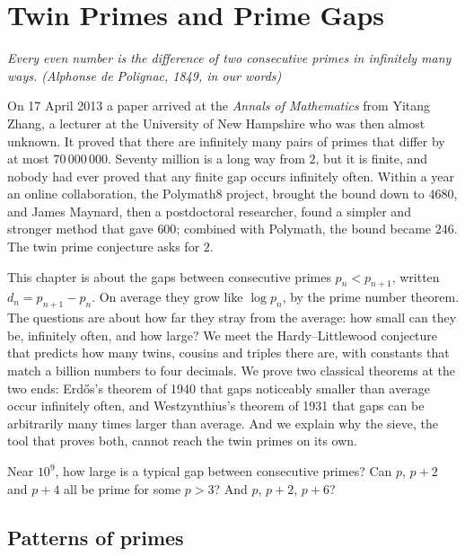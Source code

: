 \chapter{Twin Primes and Prime Gaps}\label{conjectures:ch:twins}

\begin{center}\itshape
Every even number is the difference of two consecutive primes in infinitely many ways.
\upshape(Alphonse de Polignac, 1849, in our words)
\end{center}

On 17 April 2013 a paper arrived at the \emph{Annals of Mathematics} from Yitang Zhang, a lecturer at the University of New Hampshire who was then
almost unknown. It proved that there are infinitely many pairs of primes that differ by at most $70\,000\,000$. Seventy million is a long way from $2$,
but it is finite, and nobody had ever proved that any finite gap occurs infinitely often. Within a year an online collaboration, the Polymath8 project,
brought the bound down to $4680$, and James Maynard, then a postdoctoral researcher, found a simpler and stronger method that gave $600$; combined with
Polymath, the bound became $246$. The twin prime conjecture asks for $2$.

This chapter is about the gaps between consecutive primes $p_n<p_{n+1}$, written $d_n=p_{n+1}-p_n$. On average they grow like $\log p_n$, by the prime
number theorem. The questions are about how far they stray from the average: how small can they be, infinitely often, and how large? We meet the
Hardy--Littlewood conjecture that predicts how many twins, cousins and triples there are, with constants that match a billion numbers to four
decimals. We prove two classical theorems at the two ends: Erd\H{o}s's theorem of 1940 that gaps noticeably smaller than average occur infinitely often,
and Westzynthius's theorem of 1931 that gaps can be arbitrarily many times larger than average. And we explain why the sieve, the tool that proves
both, cannot reach the twin primes on its own.

\begin{think}
Near $10^9$, how large is a typical gap between consecutive primes? Can $p$, $p+2$ and $p+4$ all be prime for some $p>3$? And $p$, $p+2$, $p+6$?
\end{think}

\section{Patterns of primes}

